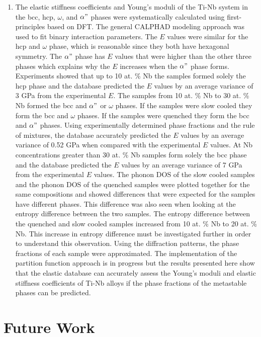\begin{enumerate}
	\item The elastic stiffness coefficients and Young's moduli of the Ti-Nb system in the bcc, hcp, $\omega$, and $\alpha"$ phases were systematically calculated using first-principles based on DFT. The general CALPHAD modeling approach was used to fit binary interaction parameters. The $E$ values were similar for the hcp and $\omega$ phase, which is reasonable since they both have hexagonal symmetry. The $\alpha"$ phase has $E$ values that were higher than the other three phases which explains why the $E$ increases when the $\alpha"$ phase forms. Experiments showed that up to 10 at. \% Nb the samples formed solely the hcp phase and the database predicted the $E$ values by an average variance of 3 GPa from the experimental $E$. The samples from 10 at. \% Nb to 30 at. \% Nb formed the bcc and $\alpha"$ or $\omega$ phases. If the samples were slow cooled they form the bcc and $\omega$ phases. If the samples were quenched they form the bcc and $\alpha"$ phases. Using experimentally determined phase fractions and the rule of mixtures, the database accurately predicted the $E$ values by an average variance of 0.52 GPa when compared with the experimental $E$ values. At Nb concentrations greater than 30 at. \% Nb samples form solely the bcc phase and the database predicted the $E$ values by an average variance of 7 GPa from the experimental $E$ values. The phonon DOS of the slow cooled samples and the phonon DOS of the quenched samples were plotted together for the same compositions and showed differences that were expected for the samples have different phases. This difference was also seen when looking at the entropy difference between the two samples. The entropy difference between the quenched and slow cooled samples increased from 10 at. \% Nb to 20 at. \% Nb. This increase in entropy difference must be investigated further in order to understand this observation. Using the diffraction patterns, the phase fractions of each sample were approximated. The implementation of the partition function approach is in progress but the results presented here show that the elastic database can accurately assess the Young's moduli and elastic stiffness coefficients of Ti-Nb alloys if the phase fractions of the metastable phases can be predicted.
\end{enumerate}

\section{Future Work}

